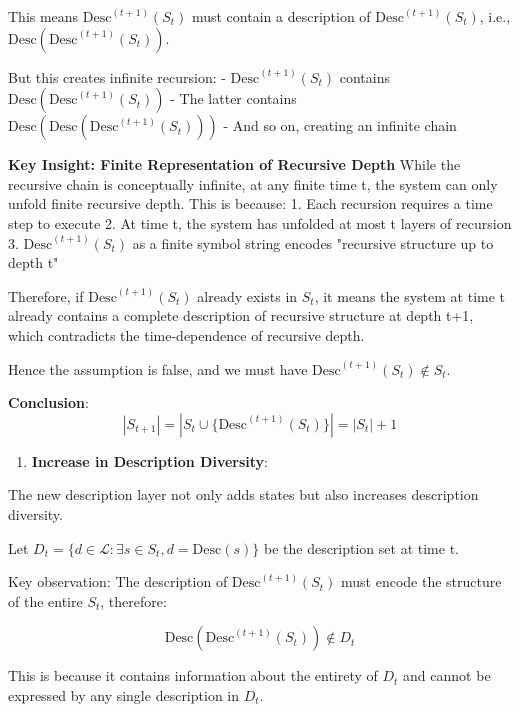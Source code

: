   This means $\text{Desc}^{(t+1)}(S_t)$ must contain a description of $\text{Desc}^{(t+1)}(S_t)$, i.e., $\text{Desc}(\text{Desc}^{(t+1)}(S_t))$.
  
  But this creates infinite recursion:
  - $\text{Desc}^{(t+1)}(S_t)$ contains $\text{Desc}(\text{Desc}^{(t+1)}(S_t))$
  - The latter contains $\text{Desc}(\text{Desc}(\text{Desc}^{(t+1)}(S_t)))$
  - And so on, creating an infinite chain
  
  \textbf{Key Insight: Finite Representation of Recursive Depth}
  While the recursive chain is conceptually infinite, at any finite time t, the system can only unfold finite recursive depth.
  This is because:
  1. Each recursion requires a time step to execute
  2. At time t, the system has unfolded at most t layers of recursion
  3. $\text{Desc}^{(t+1)}(S_t)$ as a finite symbol string encodes "recursive structure up to depth t"
  
  Therefore, if $\text{Desc}^{(t+1)}(S_t)$ already exists in $S_t$, it means the system at time t already contains
  a complete description of recursive structure at depth t+1, which contradicts the time-dependence of recursive depth.
  
  Hence the assumption is false, and we must have $\text{Desc}^{(t+1)}(S_t) \notin S_t$.
  
  \textbf{Conclusion}:
\begin{equation}
|S_{t+1}| = |S_t \cup \{\text{Desc}^{(t+1)}(S_t)\}| = |S_t| + 1
\end{equation}

\begin{enumerate}
\item \textbf{Increase in Description Diversity}:
\end{enumerate}
  The new description layer not only adds states but also increases description diversity.
  
  Let $D_t = \{d \in \mathcal{L}: \exists s \in S_t, d = \text{Desc}(s)\}$ be the description set at time t.
  
  Key observation: The description of $\text{Desc}^{(t+1)}(S_t)$ must encode the structure of the entire $S_t$, therefore:
  
\begin{equation}
\text{Desc}(\text{Desc}^{(t+1)}(S_t)) \notin D_t
\end{equation}
  
  This is because it contains information about the entirety of $D_t$ and cannot be expressed by any single description in $D_t$.

